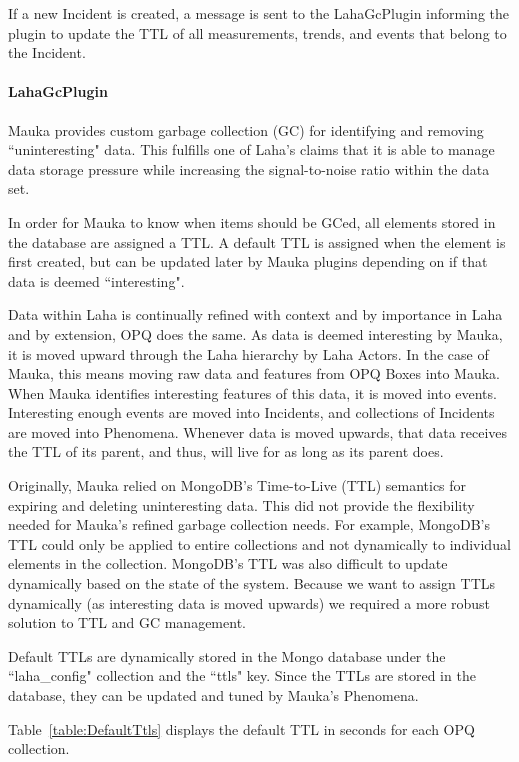 If a new Incident is created, a message is sent to the LahaGcPlugin informing the plugin to update the TTL of all measurements, trends, and events that belong to the Incident.

\paragraph{LahaGcPlugin}\label{sec:gc_plugin}
Mauka provides custom garbage collection (GC) for identifying and removing ``uninteresting" data. This fulfills one of Laha's claims that it is able to manage data storage pressure while increasing the signal-to-noise ratio within the data set.

In order for Mauka to know when items should be GCed, all elements stored in the database are assigned a TTL. A default TTL is assigned when the element is first created, but can be updated later by Mauka plugins depending on if that data is deemed ``interesting".

Data within Laha is continually refined with context and by importance in Laha and by extension, OPQ does the same. As data is deemed interesting by Mauka, it is moved upward through the Laha hierarchy by Laha Actors. In the case of Mauka, this means moving raw data and features from OPQ Boxes into Mauka. When Mauka identifies interesting features of this data, it is moved into events. Interesting enough events are moved into Incidents, and collections of Incidents are moved into Phenomena. Whenever data is moved upwards, that data receives the TTL of its parent, and thus, will live for as long as its parent does.

Originally, Mauka relied on MongoDB's Time-to-Live (TTL) semantics for expiring and deleting uninteresting data. This did not provide the flexibility needed for Mauka's refined garbage collection needs. For example, MongoDB's TTL could only be applied to entire collections and not dynamically to individual elements in the collection. MongoDB's TTL was also difficult to update dynamically based on the state of the system. Because we want to assign TTLs dynamically (as interesting data is moved upwards) we required a more robust solution to TTL and GC management.

Default TTLs are dynamically stored in the Mongo database under the ``laha\_config" collection and the ``ttls" key. Since the TTLs are stored in the database, they can be updated and tuned by Mauka's Phenomena.

Table~\ref{table:DefaultTtls} displays the default TTL in seconds for each OPQ collection.

